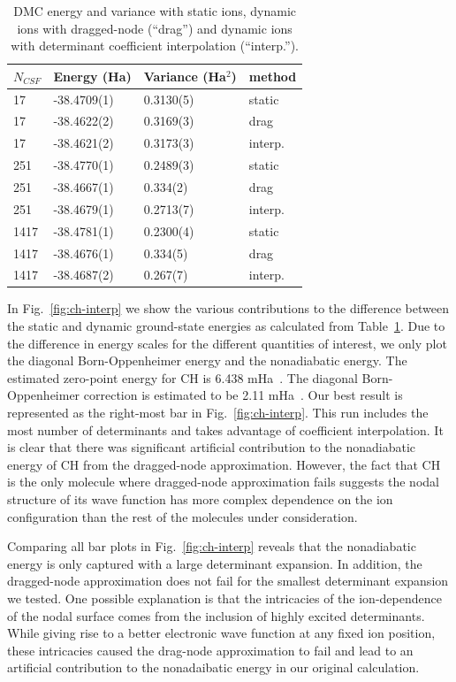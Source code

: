 \documentclass[aip,jcp,numerical,reprint]{revtex4-1}
\begin{document}
\begin{table}[h]
\begin{tabular}{llll}
\hline\hline
$N_{CSF}$ & Energy (Ha) & Variance (Ha$^2$) & method \\
\hline
17   & -38.4709(1) &  0.3130(5) &    static \\
17   & -38.4622(2) &  0.3169(3) &   drag \\
17   & -38.4621(2) &  0.3173(3) &  interp. \\
251  & -38.4770(1)&  0.2489(3) &    static \\
251  & -38.4667(1) &  0.334(2)~  &   drag \\
251  & -38.4679(1) &  0.2713(7) &  interp. \\
1417 & -38.4781(1) &  0.2300(4) &    static \\
1417 & -38.4676(1) &  0.334(5)~  &   drag \\
1417 & -38.4687(2) &  0.267(7)~  &  interp. \\
\hline\hline
\end{tabular}
\caption{DMC energy and variance with static ions, dynamic ions with dragged-node (``drag'') and dynamic ions with determinant coefficient interpolation (``interp.'').\label{tab:energy}}
\end{table}

In Fig.~\ref{fig:ch-interp} we show the various contributions to the difference between the static and dynamic ground-state energies as calculated from Table~\ref{tab:energy}. Due to the difference in energy scales for the different quantities of interest, we only plot the diagonal Born-Oppenheimer energy and the nonadiabatic energy.   The estimated zero-point energy for CH is  6.438 mHa~\cite{Feller_Corrections}. The diagonal Born-Oppenheimer correction is estimated to be 2.11 mHa~\cite{Yang2015}. Our best result is represented as the right-most bar in Fig.~\ref{fig:ch-interp}.  This run includes the most number of determinants and takes advantage of coefficient interpolation. It is clear that there was significant artificial contribution to the nonadiabatic energy of CH from the dragged-node approximation. However, the fact that CH is the only molecule where dragged-node approximation fails suggests the nodal structure of its wave function has more complex dependence on the ion configuration than the rest of the molecules under consideration.

Comparing all bar plots in Fig.~\ref{fig:ch-interp} reveals that the nonadiabatic energy is only captured with a large determinant expansion. In addition, the dragged-node approximation does not fail for the smallest determinant expansion we tested. One possible explanation is that the intricacies of the ion-dependence of the nodal surface comes from the inclusion of highly excited determinants. While giving rise to a better electronic wave function at any fixed ion position, these intricacies caused the drag-node approximation to fail and lead to an artificial contribution to the nonadaibatic energy in our original calculation.
\end{document}
